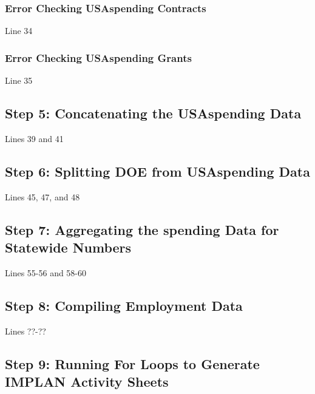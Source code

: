 \documentclass[
]{book}
\begin{document}
\hypertarget{error-checking-usaspending-contracts}{%
\subsubsection{Error Checking USAspending Contracts}\label{error-checking-usaspending-contracts}}

Line 34

\hypertarget{error-checking-usaspending-grants}{%
\subsubsection{Error Checking USAspending Grants}\label{error-checking-usaspending-grants}}

Line 35

\hypertarget{step-5-concatenating-the-usaspending-data}{%
\subsection{Step 5: Concatenating the USAspending Data}\label{step-5-concatenating-the-usaspending-data}}

Lines 39 and 41

\hypertarget{step-6-splitting-doe-from-usaspending-data}{%
\subsection{Step 6: Splitting DOE from USAspending Data}\label{step-6-splitting-doe-from-usaspending-data}}

Lines 45, 47, and 48

\hypertarget{step-7-aggregating-the-spending-data-for-statewide-numbers}{%
\subsection{Step 7: Aggregating the spending Data for Statewide Numbers}\label{step-7-aggregating-the-spending-data-for-statewide-numbers}}

Lines 55-56 and 58-60

\hypertarget{step-8-compiling-employment-data}{%
\subsection{Step 8: Compiling Employment Data}\label{step-8-compiling-employment-data}}

Lines ??-??

\hypertarget{step-9-running-for-loops-to-generate-implan-activity-sheets}{%
\subsection{Step 9: Running For Loops to Generate IMPLAN Activity Sheets}\label{step-9-running-for-loops-to-generate-implan-activity-sheets}}
\end{document}
